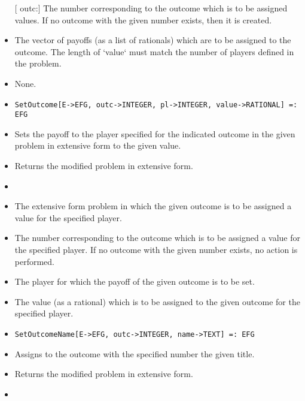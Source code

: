 \begin{itemize}
[ outc:] The number corresponding to the outcome which is to be 
assigned values.  If no outcome with the given number exists,
then it is created.
\item
[ value:] The vector of payoffs (as a list of rationals) which are 
to be assigned to the outcome.  The length of `value` must 
match the number of players defined in the problem.
\ed

\item
[Optional parameters:] None.
\ed

\item

\protect \large \begin{verbatim} 
SetOutcome[E->EFG, outc->INTEGER, pl->INTEGER, value->RATIONAL] =: EFG
\end{verbatim}\normalsize

\bd
\item
[Description:] Sets the payoff to the player specified for the indicated
outcome in the given problem in extensive form to the given value.
\item
[Return value:] Returns the modified problem in extensive form.
\item
[Required parameters:]\hfil\null
	
\bd
\item
[ E:] The extensive form problem in which the given outcome is to be
assigned a value for the specified player.
\item
[ outc:] The number corresponding to the outcome which is to be 
assigned a value for the specified player.  If no outcome with
the given number exists, no action is performed.
\item
[ pl:] The player for which the payoff of the given outcome is to be
set.
\item
[ value:] The value (as a rational) which is to be assigned to the 
given outcome for the specified player.
\ed
\ed

\item

\protect \large \begin{verbatim}
SetOutcomeName[E->EFG, outc->INTEGER, name->TEXT] =: EFG
\end{verbatim}\normalsize

\bd
\item
[Description:] Assigns to the outcome with the specified number the 
given title.
\item
[Return value:] Returns the modified problem in extensive form.
\item
[Required parameters:]\hfil\null
	

\end{itemize}
